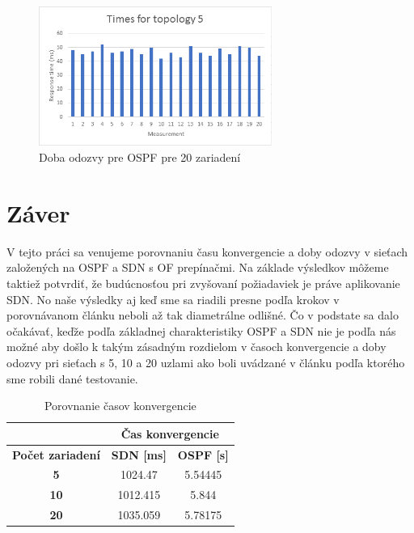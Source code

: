 \documentclass[conference]{IEEEtran}
\begin{document}
\begin{figure}[h!]
\centering
\includegraphics[width=3in]{../img/5responseospf}
\caption{Doba odozvy pre OSPF pre 20 zariadení}
\end{figure}


\section{Záver}

V tejto práci sa venujeme porovnaniu času konvergencie a doby odozvy v sieťach založených na OSPF a SDN s OF prepínačmi. Na základe výsledkov môžeme taktiež potvrdiť, že budúcnosťou pri zvyšovaní požiadaviek je práve aplikovanie SDN. No naše výsledky aj keď sme sa riadili presne podľa krokov v porovnávanom článku neboli až tak diametrálne odlišné. Čo v podstate sa dalo očakávať, keďže podľa základnej charakteristiky OSPF a SDN nie je podľa nás možné aby došlo k takým zásadným rozdielom v časoch konvergencie a doby odozvy pri sieťach s 5, 10 a 20 uzlami ako boli uvádzané v článku podľa ktorého sme robili dané testovanie. 


\begin{table}[h!]
\centering
\caption{Porovnanie časov konvergencie}
\label{convergencel}
\begin{tabular}{|c|c|c|}
\hline
                         & \multicolumn{2}{c|}{\textbf{Čas konvergencie}} \\ \hline
\textbf{Počet zariadení} & \textbf{SDN {[}ms{]}}  & \textbf{OSPF {[}s{]}} \\ \hline
\textbf{5}               & 1024.47                &          5.54445              \\ \hline
\textbf{10}              & 1012.415             &          5.844            \\ \hline
\textbf{20}              & 1035.059               &        5.78175                \\ \hline
\end{tabular}
\end{table}
\end{document}
